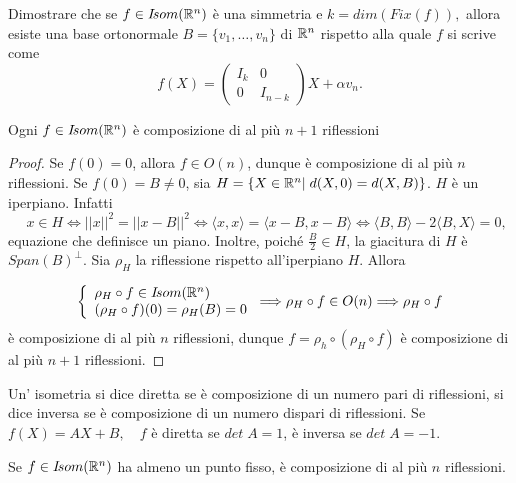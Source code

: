  \begin{exercise}
Dimostrare che se $f\in I\!som( \mathbb R^n)$ è una simmetria e
 $k=dim(Fix(f)),$ allora esiste una base ortonormale $B=\{v_1,\ldots,v_n\}$ di $\mathbb R^n$ rispetto alla quale
 $f$ si scrive come
 $$f(X)=\left(
 \begin{array}{cc}
  I_k & 0\\
  0 & I_{n-k}
 \end{array}
 \right)
 X+\alpha v_n.
 $$
 \end{exercise}
 
 \begin{theorem}
 Ogni $f\in I\!som( \mathbb R^n)$ è composizione di al più $n+1$ riflessioni
 \end{theorem}
 
 \begin{proof}
 Se $f(0)=0$, allora $f\in O(n)$, dunque è composizione di al più $n$ 
 riflessioni.
 Se $f(0)=B\ne 0$, sia $H=\{X\in \mathbb R^n|\;d(X,0)=d(X,B)\}$.
 $H$ è un iperpiano. Infatti 
 \[
  \quad x\in H\Longleftrightarrow ||x||^2=||x-B||^2\Longleftrightarrow\langle x,x\rangle=
 \langle x-B,x-B\rangle\Longleftrightarrow\langle B,B\rangle-2\langle B,X\rangle=0,
 \]
 equazione che definisce un piano. Inoltre, poiché $\frac{B}{2}\in H$, la giacitura di $H$ è 
 $Span(B)^{\bot}$.
 Sia $\rho_H$ la riflessione rispetto all'iperpiano $H$.
 Allora
 
 \[ \left\{
 \begin{array}{l}
  \rho_H\circ f\in I\!som( \mathbb R^n) \\
  (\rho_H\circ f)(0)=\rho_H(B)=0
 \end{array}
 \right.
 \Longrightarrow \rho_H\circ f\in O(n)\Longrightarrow \rho_H\circ f
 \]
 è composizione di al più $n$ riflessioni, dunque $f=\rho_h\circ(\rho_H\circ f)$
 è composizione di al più $n+1$ riflessioni.
  \end{proof}
 
 \begin{definition}Un' isometria si dice diretta se è composizione di un numero pari di riflessioni, si dice inversa se
 è composizione di un numero dispari di riflessioni. Se $f(X)=AX+B,\quad f$ è diretta se $det\; A=1$,
 è inversa se $det\; A=-1$.
 \end{definition}
 
 \begin{proposition}
 Se $f\in I\!som( \mathbb R^n)$ ha almeno un punto fisso, è composizione di al più $n$ riflessioni.
 \end{proposition}
 

